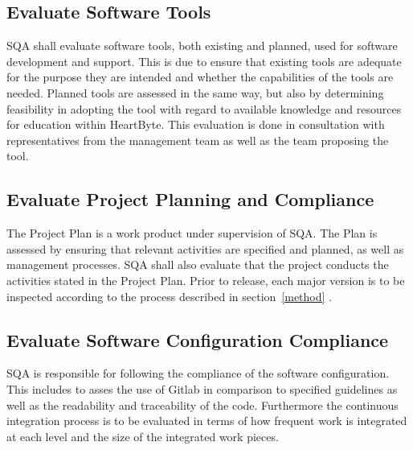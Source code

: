 \documentclass{article}
\begin{document}
	\subsection{Evaluate Software Tools}
	SQA shall evaluate software tools, both existing and planned, used for software development and support. This is due to ensure that existing tools are adequate for the purpose they are intended and whether the capabilities of the tools are needed. Planned tools are assessed in the same way, but also by determining feasibility in adopting the tool with regard to available knowledge and resources for education within HeartByte. This evaluation is done in consultation with representatives from the management team as well as the team proposing the tool.
	
	\subsection{Evaluate Project Planning and Compliance}
	The Project Plan is a work product under supervision of SQA. The Plan is assessed by ensuring that relevant activities are specified and planned, as well as management processes. SQA shall also evaluate that the project conducts the activities stated in the Project Plan. Prior to release, each major version is to be inspected according to the process described in  section~\ref{method} . 
	
	
	
	\subsection{Evaluate Software Configuration Compliance}
	SQA is responsible for following the compliance of the software configuration. This includes to asses the use of Gitlab in comparison to specified guidelines as well as the readability and traceability of the code. Furthermore the continuous integration process is to be evaluated in terms of how frequent work is integrated at each level and the size of the integrated work pieces.
	
\end{document}
